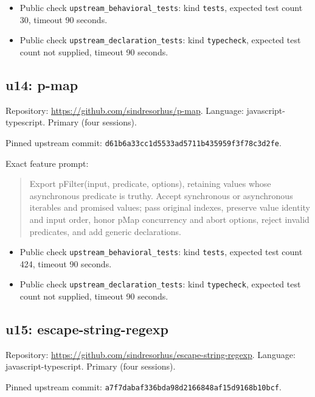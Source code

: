 \documentclass[manuscript,screen,nonacm]{acmart}
\providecommand{\tightlist}{\setlength{\itemsep}{0pt}\setlength{\parskip}{0pt}}
\begin{document}
\begin{itemize}
\tightlist
\item
  Public check \nolinkurl{upstream_behavioral_tests}: kind
  \texttt{tests}, expected test count 30, timeout 90 seconds.
\item
  Public check \nolinkurl{upstream_declaration_tests}: kind
  \texttt{typecheck}, expected test count not supplied, timeout 90
  seconds.
\end{itemize}

\subsection{u14: p-map}\label{u14-p-map}

Repository: \url{https://github.com/sindresorhus/p-map}. Language:
javascript-typescript. Primary (four sessions).

Pinned upstream commit:
\nolinkurl{d61b6a33cc1d5533ad5711b435959f3f78c3d2fe}.

Exact feature prompt:

\begin{quote}
Export pFilter(input, predicate, options), retaining values whose
asynchronous predicate is truthy. Accept synchronous or asynchronous
iterables and promised values; pass original indexes, preserve value
identity and input order, honor pMap concurrency and abort options,
reject invalid predicates, and add generic declarations.
\end{quote}

\begin{itemize}
\tightlist
\item
  Public check \nolinkurl{upstream_behavioral_tests}: kind
  \texttt{tests}, expected test count 424, timeout 90 seconds.
\item
  Public check \nolinkurl{upstream_declaration_tests}: kind
  \texttt{typecheck}, expected test count not supplied, timeout 90
  seconds.
\end{itemize}

\subsection{u15: escape-string-regexp}\label{u15-escape-string-regexp}

Repository: \url{https://github.com/sindresorhus/escape-string-regexp}.
Language: javascript-typescript. Primary (four sessions).

Pinned upstream commit:
\nolinkurl{a7f7dabaf336bda98d2166848af15d9168b10bcf}.
\end{document}
